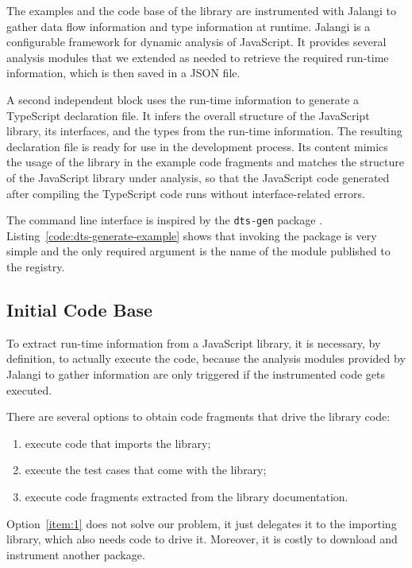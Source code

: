\documentclass[a4paper,english,cleveref, autoref]{lipics-v2019}
\newcommand{\coderef}[1]{Listing~\ref{#1}}
\begin{document}
The examples and the code base of the library are instrumented with
Jalangi \cite{DBLP:conf/sigsoft/SenKBG13} to gather data flow
information and type information at runtime. Jalangi is a configurable
framework for dynamic analysis of JavaScript. It provides several
analysis modules that we extended as needed to retrieve the required
run-time information, which is then saved in a JSON file. 

A second independent block uses the run-time information to generate a
TypeScript declaration file. It infers the overall structure of the JavaScript
library, its interfaces, and the types from the run-time information. 
The resulting declaration file is ready for use in the development
process. Its content mimics the usage of the library in the example
code fragments and matches the structure of the
JavaScript library under analysis, so that the JavaScript code
generated after compiling the TypeScript code runs without
interface-related errors.

The command line interface is inspired by the \texttt{dts-gen} package
\cite{dts-gen}. \coderef{code:dts-generate-example} shows
that invoking the package is very simple and the only required
argument is the name of the module published to the \NPM{} registry. 


\subsection{Initial Code Base}
\label{sec:initial-code-base}

To extract run-time information from a JavaScript library, it is
necessary, by definition, to actually execute the code, because the
analysis modules provided by Jalangi to gather information are only
triggered if the instrumented code gets executed.

There are several options to obtain code fragments that drive the
library code:
\begin{enumerate}
\item\label{item:1} execute code that imports the library;
\item\label{item:2} execute the test cases that come with the library;
\item\label{item:3} execute code fragments extracted from the library documentation.
\end{enumerate}

Option~\ref{item:1} does not solve our problem, it just delegates it
to the importing library, which also needs code to drive it. Moreover,
it is costly to download and instrument another package.
\end{document}
